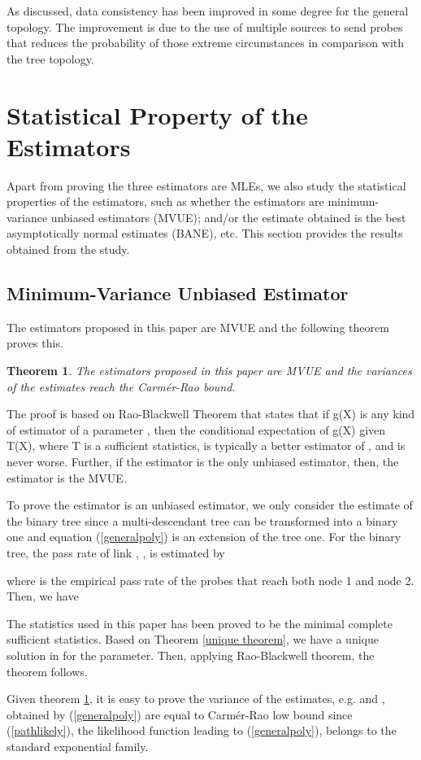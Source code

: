\documentclass[10pt,twocolumn]{IEEEtran}
\newtheorem{theorem}{\hspace*{1pc}Theorem}
\begin{document}
As discussed, data consistency has been improved in some degree for
the general topology. The improvement is due to the use of multiple
sources to send probes that reduces the probability of those extreme
circumstances in comparison with the tree topology.
\section{Statistical Property of the Estimators}

Apart from proving the three estimators are MLEs, we also study the
statistical properties of the estimators, such as whether the
estimators are minimum-variance unbiased estimators (MVUE); and/or the
estimate obtained is the best asymptotically normal estimates (BANE),
etc. This section provides the results obtained from the study.
\subsection{ Minimum-Variance Unbiased Estimator}
The estimators proposed in this paper are MVUE and the following
theorem proves this.
\begin{theorem} \label{MVUE theorem}
The estimators proposed in this paper are MVUE and the variances of
the estimates reach the Carm\'{e}r-Rao bound.
\end{theorem}
\begin{IEEEproof}
The proof is based on Rao-Blackwell Theorem that states that if g(X)
is any kind of estimator of a parameter , then the conditional
expectation of g(X) given T(X), where T is a sufficient statistics, is
typically a better estimator of , and is never worse. Further,
if the estimator is the only unbiased estimator, then, the estimator
is the MVUE.

To prove the estimator is an unbiased estimator, we only consider the
estimate of the binary tree since a multi-descendant tree can be
transformed into a binary one and equation (\ref{generalpoly}) is an
extension of the tree one. For the binary tree, the pass rate of link
, , is estimated by

where  is the empirical pass
rate of the probes that reach both node 1 and node 2. Then, we have

The statistics used in this paper has been proved to be the minimal
complete sufficient statistics. Based on Theorem \ref{unique theorem},
we have a unique solution in  for the parameter. Then, applying
Rao-Blackwell theorem, the theorem follows.

Given theorem \ref{MVUE theorem}, it is easy to prove the variance of
the estimates, e.g.  and , obtained by
(\ref{generalpoly}) are equal to Carm\'{e}r-Rao low bound since
(\ref{pathlikely}), the likelihood function leading to
(\ref{generalpoly}), belongs to the standard exponential family.
\end{IEEEproof}
\end{document}
